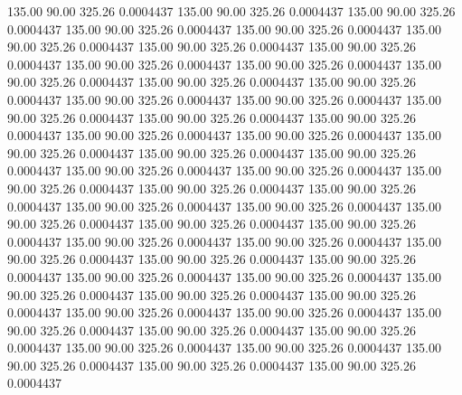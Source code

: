  135.00   90.00  325.26   0.0004437
 135.00   90.00  325.26   0.0004437
 135.00   90.00  325.26   0.0004437
 135.00   90.00  325.26   0.0004437
 135.00   90.00  325.26   0.0004437
 135.00   90.00  325.26   0.0004437
 135.00   90.00  325.26   0.0004437
 135.00   90.00  325.26   0.0004437
 135.00   90.00  325.26   0.0004437
 135.00   90.00  325.26   0.0004437
 135.00   90.00  325.26   0.0004437
 135.00   90.00  325.26   0.0004437
 135.00   90.00  325.26   0.0004437
 135.00   90.00  325.26   0.0004437
 135.00   90.00  325.26   0.0004437
 135.00   90.00  325.26   0.0004437
 135.00   90.00  325.26   0.0004437
 135.00   90.00  325.26   0.0004437
 135.00   90.00  325.26   0.0004437
 135.00   90.00  325.26   0.0004437
 135.00   90.00  325.26   0.0004437
 135.00   90.00  325.26   0.0004437
 135.00   90.00  325.26   0.0004437
 135.00   90.00  325.26   0.0004437
 135.00   90.00  325.26   0.0004437
 135.00   90.00  325.26   0.0004437
 135.00   90.00  325.26   0.0004437
 135.00   90.00  325.26   0.0004437
 135.00   90.00  325.26   0.0004437
 135.00   90.00  325.26   0.0004437
 135.00   90.00  325.26   0.0004437
 135.00   90.00  325.26   0.0004437
 135.00   90.00  325.26   0.0004437
 135.00   90.00  325.26   0.0004437
 135.00   90.00  325.26   0.0004437
 135.00   90.00  325.26   0.0004437
 135.00   90.00  325.26   0.0004437
 135.00   90.00  325.26   0.0004437
 135.00   90.00  325.26   0.0004437
 135.00   90.00  325.26   0.0004437
 135.00   90.00  325.26   0.0004437
 135.00   90.00  325.26   0.0004437
 135.00   90.00  325.26   0.0004437
 135.00   90.00  325.26   0.0004437
 135.00   90.00  325.26   0.0004437
 135.00   90.00  325.26   0.0004437
 135.00   90.00  325.26   0.0004437
 135.00   90.00  325.26   0.0004437
 135.00   90.00  325.26   0.0004437
 135.00   90.00  325.26   0.0004437
 135.00   90.00  325.26   0.0004437
 135.00   90.00  325.26   0.0004437
 135.00   90.00  325.26   0.0004437
